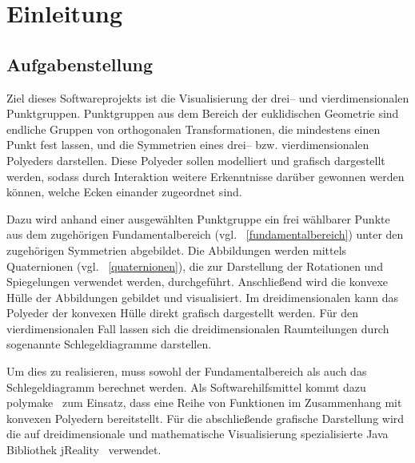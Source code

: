 \section{Einleitung}

\subsection{Aufgabenstellung}

    Ziel dieses Softwareprojekts ist die Visualisierung der drei-- und vierdimensionalen Punktgruppen. Punktgruppen aus dem Bereich der euklidischen Geometrie sind endliche Gruppen von orthogonalen Transformationen, die mindestens einen Punkt fest lassen, und die Symmetrien eines drei-- bzw. vierdimensionalen Polyeders darstellen. Diese Polyeder sollen modelliert und grafisch dargestellt werden, sodass durch Interaktion weitere Erkenntnisse darüber gewonnen werden können, welche Ecken einander zugeordnet sind.
    
    Dazu wird anhand einer ausgewählten Punktgruppe ein frei wählbarer Punkte aus dem zugehörigen Fundamentalbereich (vgl. ~\ref{fundamentalbereich}) unter den zugehörigen Symmetrien abgebildet. Die Abbildungen werden mittels Quaternionen (vgl. ~\ref{quaternionen}), die zur Darstellung der Rotationen und Spiegelungen verwendet werden, durchgeführt. Anschließend wird die konvexe Hülle der Abbildungen gebildet und visualisiert. Im dreidimensionalen kann das Polyeder der konvexen Hülle direkt grafisch dargestellt werden. Für den vierdimensionalen Fall lassen sich die dreidimensionalen Raumteilungen durch sogenannte Schlegeldiagramme darstellen.
    
    Um dies zu realisieren, muss sowohl der Fundamentalbereich als auch das Schlegeldiagramm berechnet werden. Als Softwarehilfsmittel kommt dazu polymake~\cite{polymake} zum Einsatz, dass eine Reihe von Funktionen im Zusammenhang mit konvexen Polyedern bereitstellt. Für die abschließende grafische Darstellung wird die auf dreidimensionale und mathematische Visualisierung spezialisierte Java Bibliothek jReality~\cite{jreality} verwendet.

